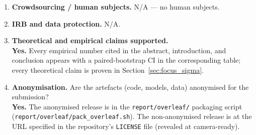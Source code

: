 \begin{enumerate}
\item \textbf{Crowdsourcing / human subjects.}  N/A — no human
subjects.

\item \textbf{IRB and data protection.}  N/A.

\item \textbf{Theoretical and empirical claims supported.}
\\\textbf{Yes.}  Every empirical number cited in the abstract,
introduction, and conclusion appears with a paired-bootstrap CI in
the corresponding table; every theoretical claim is proven in
Section~\ref{sec:focus_sigma}.

\item \textbf{Anonymisation.}  Are the artefacts (code, models,
data) anonymised for the submission?
\\\textbf{Yes.}  The anonymised release is in the
\texttt{report/overleaf/} packaging script
(\texttt{report/overleaf/pack\_overleaf.sh}).  The non-anonymised
release is at the URL specified in the repository's
\texttt{LICENSE} file (revealed at camera-ready).
\end{enumerate}

